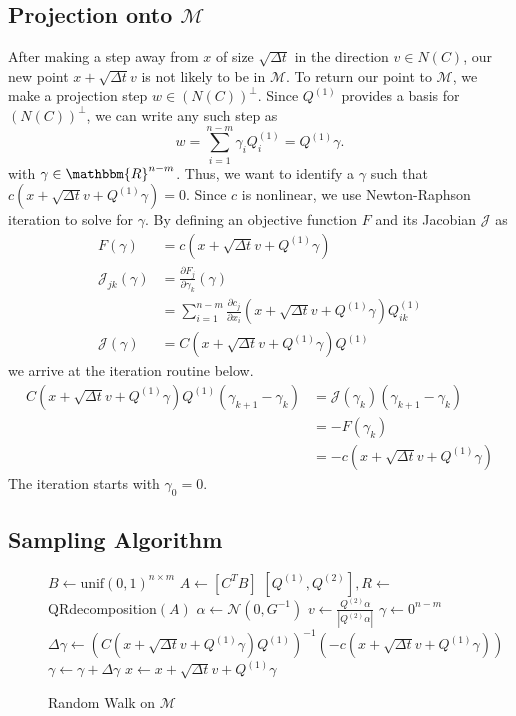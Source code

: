 \subsection{Projection onto $\mathcal{M}$}
After making a step away from $x$ of size $\sqrt{\Delta t}$ in the direction $v \in N(C)$, our new point $x + \sqrt{\Delta t}v$ is not likely to be in $\mathcal{M}$. To return our point to $\mathcal{M}$, we make a projection step $w \in (N(C))^\perp$. Since $Q^{(1)}$ provides a basis for $(N(C))^\perp$, we can write any such step as 
$$w = \sum_{i=1}^{n-m} \gamma_iQ^{(1)}_i = Q^{(1)}\gamma.$$
with $\gamma \in \mathbbm{R}^{n-m}$. Thus, we want to identify a $\gamma$ such that $c(x + \sqrt{\Delta t} v + Q^{(1)}\gamma) = 0$. Since $c$ is nonlinear, we use Newton-Raphson iteration to solve for $\gamma$. By defining an objective function $F$ and its Jacobian $\mathcal{J}$ as
\begin{align}
        F(\gamma) &= c(x + \sqrt{\Delta t} v + Q^{(1)}\gamma) \\
        \mathcal{J}_{jk}(\gamma) &= \frac{\partial F_j}{\partial \gamma_k}(\gamma) \\
        &= \sum_{i=1}^{n-m} \frac{\partial c_j}{\partial x_i}(x + \sqrt{\Delta t} v + Q^{(1)}\gamma)Q^{(1)}_{ik} \\
        \mathcal{J}(\gamma) &= C(x + \sqrt{\Delta t} v + Q^{(1)}\gamma)Q^{(1)}
\end{align}
we arrive at the iteration routine below. 
\begin{align}
        C(x + \sqrt{\Delta t} v + Q^{(1)}\gamma)Q^{(1)}\left(\gamma_{k+1} - \gamma_{k}\right) &= \mathcal{J}(\gamma_k)\left(\gamma_{k+1} - \gamma_{k}\right)\\
         &= -F(\gamma_k) \\
         &= -c(x + \sqrt{\Delta t} v + Q^{(1)}\gamma)
\end{align}
The iteration starts with $\gamma_0 = 0$.

\subsection{Sampling Algorithm}

\begin{figure}[ht]
\centering
\begin{algorithmic}
        \State $B \gets \text{unif}(0,1)^{n\times m}$       
        \State $A \gets \left[C^T B\right]$
        \State $[Q^{(1)}, Q^{(2)}], R \gets$QRdecomposition$(A)$
        \State $\alpha \gets \mathcal{N}(0,G^{-1})$
        \State $v \gets \frac{Q^{(2)}\alpha}{|Q^{(2)}\alpha|}$
        \State $\gamma \gets 0^{n-m}$
                     \State $\Delta\gamma \gets (C(x + \sqrt{\Delta t} v + Q^{(1)}\gamma)Q^{(1)})^{-1}(-c(x + \sqrt{\Delta t} v + Q^{(1)}\gamma))$
                     \State $\gamma \gets \gamma + \Delta\gamma$
        \EndWhile   
        \State $x \gets x + \sqrt{\Delta t}v + Q^{(1)}\gamma$
\EndFor
\end{algorithmic}
\caption{Random Walk on $\mathcal{M}$}
\end{figure}


